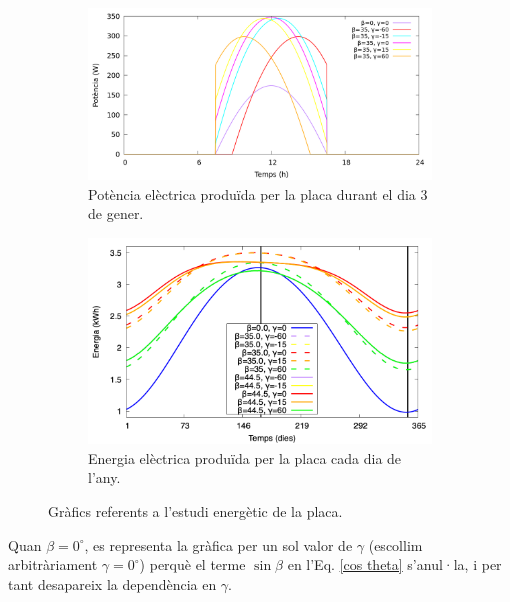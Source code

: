 \documentclass[11pt]{article}
\begin{document}
\begin{figure}[H]
    \centering
    \begin{subfigure}{0.5\textwidth}
        \centering
        \includegraphics[width=\textwidth]{dia_3gener_pot_plot.png}
        \caption{Potència elèctrica produïda per la placa durant el dia 3 de gener.}
        \label{fig: potencia}
    \end{subfigure}%
    \hspace{0.000001\textwidth}%
    \begin{subfigure}{0.5\textwidth}
        \centering
        \includegraphics[width=\textwidth]{energia.png}
        \caption{Energia elèctrica produïda per la placa cada dia de l'any.}
        \label{fig: energia}
    \end{subfigure}
    \caption{Gràfics referents a l'estudi energètic de la placa.}
    \label{estudi energia}
\end{figure}

Quan $\beta=0^{\circ}$, es representa la gràfica per un sol valor de $\gamma$ (escollim arbitràriament $\gamma=0^{\circ}$) perquè el terme $\sin\beta$ en l’Eq. \eqref{cos theta} s’anul·la, i per tant desapareix la dependència en $\gamma$.
\end{document}
